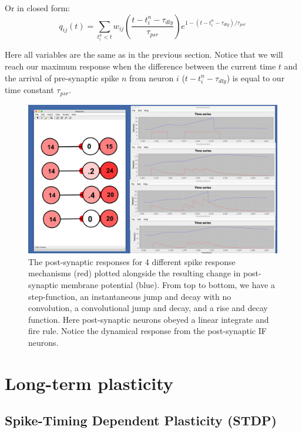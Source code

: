 Or in closed form:
\begin{equation*}
q_{ij}(t) = \sum_{t^n_i < t} w_{ij}\left(\frac{t-t^n_i-\tau_{dly}}{\tau_{psr}}\right)e^{1-(t-t^n_i-\tau_{dly})/\tau_{psr}}
\end{equation*}

Here all variables are the same as in the previous section. Notice that we will reach our maximum response when the difference between the current time $t$ and the arrival of pre-synaptic spike $n$ from neuron $i$ ($t-t^n_i - \tau_{dly}$) is equal to our time constant $\tau_{psr}$. 

\begin{figure}[h]
\centering
\includegraphics[width=\textwidth]{./images/SR_VoltTraces.png}
\caption[Simbrain screenshot by Zo\"e Tosi]{The post-synaptic responses for 4 different spike response mechanisms (red) plotted alongside the resulting change in post-synaptic membrane potential (blue). From top to bottom, we have a step-function, an instantaneous jump and decay with no convolution, a convolutional jump and decay, and a rise and decay function. Here post-synaptic neurons obeyed a linear integrate and fire rule. Notice the dynamical response from the post-synaptic IF neurons. }
\label{SR_Traces}
\end{figure}


\section{Long-term plasticity}

\subsection{Spike-Timing Dependent Plasticity (STDP)}

